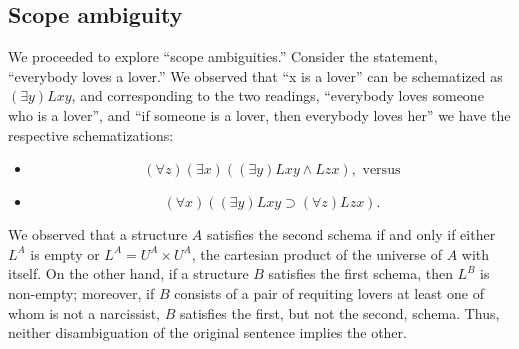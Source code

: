 \subsection{Scope ambiguity}
We proceeded to explore ``scope ambiguities.'' Consider the statement, ``everybody loves a lover.'' We observed that ``x is a lover'' can be schematized as $(\exists y)Lxy$, and corresponding to the two readings, ``everybody loves someone who is a lover'', and ``if someone is a lover, then everybody loves her'' we have the respective schematizations:
\begin{itemize}
\item
\[(\forall z)(\exists x)((\exists y)Lxy\wedge Lzx),\mbox{ versus}\]
\item
\[(\forall x)((\exists y)Lxy\supset (\forall z)Lzx).\]
\end{itemize}
We observed that a structure $A$ satisfies the second schema if and only if either $L^A$ is empty or $L^A=U^A\times U^A$, the cartesian product of the universe of $A$ with itself. On the other hand, if a structure $B$ satisfies the first schema, then $L^B$ is non-empty; moreover, if $B$ consists of a pair of requiting lovers at least one of whom is not a narcissist, $B$ satisfies the first, but not the second, schema. Thus, neither disambiguation of the original sentence implies the other.
\iffalse
\subsection{Some properties of binary relations}
We went on to discuss several important properties of relations.
\begin{itemize}
\item
$L^A$ is \emph{reflexive} if and only if
\[A\models (\forall x)Lxx.\]
\item
$L^A$ is \emph{irreflexive} if and only if
\[A\models (\forall x)\neg Lxx.\]
\item
$L^A$ is \emph{symmetric} if and only if
\[A\models (\forall x)(\forall y)(Lxy\supset Lyx).\]
\item
$L^A$ is \emph{asymmetric} if and only if
\[A\models (\forall x)(\forall y)(Lxy\supset \neg Lyx).\]
\item
$L^A$ is \emph{transitive} if and only if
\[A\models (\forall x)(\forall y)(\forall z)(Lxy\supset (Lyz\supset Lxz)).\]
\item
$A$ is a \emph{simple graph} if and only if $L^A$ is irreflexive and symmetric.
\end{itemize}
\fi

